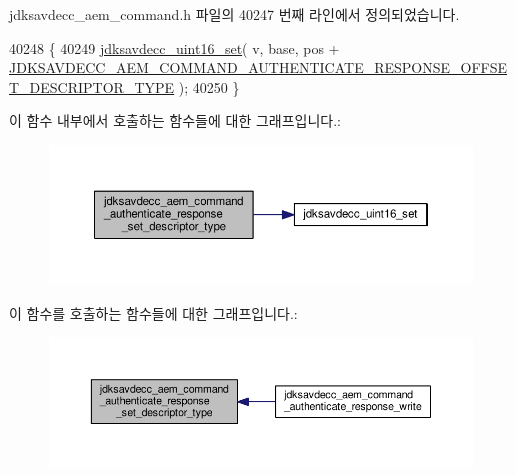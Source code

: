 jdksavdecc\+\_\+aem\+\_\+command.\+h 파일의 40247 번째 라인에서 정의되었습니다.


\begin{DoxyCode}
40248 \{
40249     \hyperlink{group__endian_ga14b9eeadc05f94334096c127c955a60b}{jdksavdecc\_uint16\_set}( v, base, pos + 
      \hyperlink{group__command__authenticate__response_ga6ddae933ca133d914d431563b2058f6d}{JDKSAVDECC\_AEM\_COMMAND\_AUTHENTICATE\_RESPONSE\_OFFSET\_DESCRIPTOR\_TYPE}
       );
40250 \}
\end{DoxyCode}


이 함수 내부에서 호출하는 함수들에 대한 그래프입니다.\+:
\nopagebreak
\begin{figure}[H]
\begin{center}
\leavevmode
\includegraphics[width=350pt]{group__command__authenticate__response_ga029163e6487aa262c99ef95f1363d1a1_cgraph}
\end{center}
\end{figure}




이 함수를 호출하는 함수들에 대한 그래프입니다.\+:
\nopagebreak
\begin{figure}[H]
\begin{center}
\leavevmode
\includegraphics[width=350pt]{group__command__authenticate__response_ga029163e6487aa262c99ef95f1363d1a1_icgraph}
\end{center}
\end{figure}


